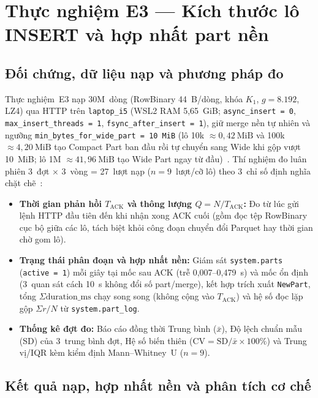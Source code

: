 \documentclass[13pt,a4paper]{report}
\begin{document}
\section{Thực nghiệm E3 --- Kích thước lô INSERT và hợp nhất part nền}

\subsection{Đối chứng, dữ liệu nạp và phương pháp đo}
Thực nghiệm~E3 nạp 30M~dòng (RowBinary 44~B/dòng, khóa $K_1$, $g = 8.192$, LZ4) qua HTTP trên \texttt{laptop\_\allowbreak{}i5} (WSL2 RAM 5,65~GiB; \texttt{async\_\allowbreak{}insert = 0}, \texttt{max\_\allowbreak{}insert\_\allowbreak{}threads = 1}, \texttt{fsync\_\allowbreak{}after\_\allowbreak{}insert = 1}), giữ merge nền tự nhiên và ngưỡng \texttt{min\_\allowbreak{}bytes\_\allowbreak{}for\_\allowbreak{}wide\_\allowbreak{}part = 10~MiB} (lô 10k $\approx 0{,}42~\text{MiB}$ và 100k $\approx 4{,}20~\text{MiB}$ tạo Compact Part ban đầu rồi tự chuyển sang Wide khi gộp vượt 10~MiB; lô 1M $\approx 41{,}96~\text{MiB}$ tạo Wide Part ngay từ đầu)~\cite{S2, S9, S13}. Thí nghiệm đo luân phiên 3~đợt ${\times}$ 3~vòng = 27~lượt nạp ($n = 9$~lượt/cỡ lô) theo 3~chỉ số định nghĩa chặt chẽ~\cite{S8, M2, M3}:
\begin{itemize}
    \setlength{\itemsep}{2pt}\setlength{\parskip}{0pt}
    \item \textbf{Thời gian phản hồi $T_{\text{ACK}}$ và thông lượng $Q = N / T_{\text{ACK}}$:} Đo từ lúc gửi lệnh HTTP đầu tiên đến khi nhận xong ACK cuối (gồm đọc tệp RowBinary cục bộ giữa các lô, tách biệt khỏi công đoạn chuyển đổi Parquet hay thời gian chờ gom lô).
    \item \textbf{Trạng thái phân đoạn và hợp nhất nền:} Giám sát \texttt{system.\allowbreak{}parts} (\texttt{active = 1}) mỗi giây tại mốc sau ACK (trễ 0,007--0,479~s) và mốc ổn định (3~quan sát cách 10~s không đổi số part/merge), kết hợp trích xuất \texttt{NewPart}, tổng $\Sigma\text{duration\_ms}$ chạy song song (không cộng vào $T_{\text{ACK}}$) và hệ số đọc lặp gộp $\Sigma r / N$ từ \texttt{system.\allowbreak{}part\_\allowbreak{}log}.
    \item \textbf{Thống kê đợt đo:} Báo cáo đồng thời Trung bình ($\bar{x}$), Độ lệch chuẩn mẫu (SD) của 3~trung bình đợt, Hệ số biến thiên ($\text{CV} = \text{SD}/\bar{x} \times 100\%$) và Trung vị/IQR kèm kiểm định Mann--Whitney~U ($n = 9$).
\end{itemize}

\subsection{Kết quả nạp, hợp nhất nền và phân tích cơ chế}
\end{document}
